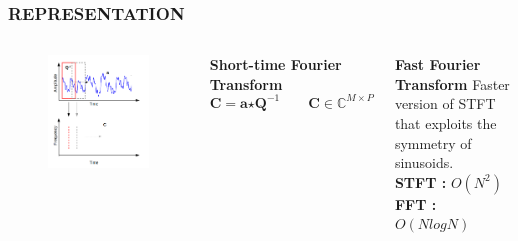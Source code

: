 \documentclass{beamer}
\begin{document}
\begin{frame}[noframenumbering]
\frametitle{REPRESENTATION}
\begin{columns}[c]
\begin{figure}
\includegraphics[width=\textwidth]{rep_1}
\end{figure}
\begin{block}{\textbf{Short-time Fourier Transform}}
\[
\textbf{C} = \textbf{a} \bm{\star} \textbf{Q}^{-1} \qquad \textbf{C} \in \mathbb{C}^{M \times P}
\]
\end{block}
\begin{block}{\textbf{Fast Fourier Transform}}
Faster version of STFT that exploits the symmetry of sinusoids.\\
\textbf{STFT :} $O(N^{2})$\\
\textbf{FFT :} $O(NlogN)$
\end{block}
\end{columns}
\end{frame}
\end{document}
